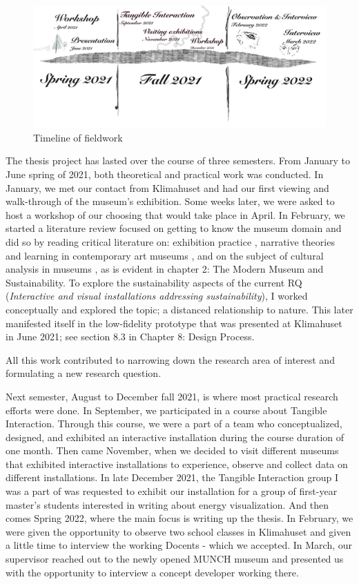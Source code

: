 \begin{figure}[H]
\includegraphics[width=14cm]{pictures/methodology/timeline.jpg}
\caption{Timeline of fieldwork}
\centering 
\end{figure}

The thesis project has lasted over the course of three semesters. From January to June spring of 2021, both theoretical and practical work was conducted. In January, we met our contact from Klimahuset and had our first viewing and walk-through of the museum's exhibition. Some weeks later, we were asked to host a workshop of our choosing that would take place in April. In February, we started a literature review focused on getting to know the museum domain and did so by reading critical literature on: exhibition practice \autocite{Thi_book}, narrative theories and learning in contemporary art museums \autocite{narrative_sitzia}, and on the subject of cultural analysis in museums \autocite{Miekebal_book}, as is evident in chapter 2: The Modern Museum and Sustainability. To explore the sustainability aspects of the current RQ (\emph{Interactive and visual installations addressing sustainability}), I worked conceptually and explored the topic; a distanced relationship to nature. This later manifested itself in the low-fidelity prototype that was presented at Klimahuset in June 2021; see section 8.3 in Chapter 8: Design Process.

All this work contributed to narrowing down the research area of interest and formulating a new research question. 

Next semester, August to December fall 2021, is where most practical research efforts were done. In September, we participated in a course about Tangible Interaction. Through this course, we were a part of a team who conceptualized, designed, and exhibited an interactive installation during the course duration of one month. Then came November, when we decided to visit different museums that exhibited interactive installations to experience, observe and collect data on different installations. In late December 2021, the Tangible Interaction group I was a part of was requested to exhibit our installation for a group of first-year master's students interested in writing about energy visualization. And then comes Spring 2022, where the main focus is writing up the thesis. In February, we were given the opportunity to observe two school classes in Klimahuset and given a little time to interview the working Docents - which we accepted. In March, our supervisor reached out to the newly opened MUNCH museum and presented us with the opportunity to interview a concept developer working there.

